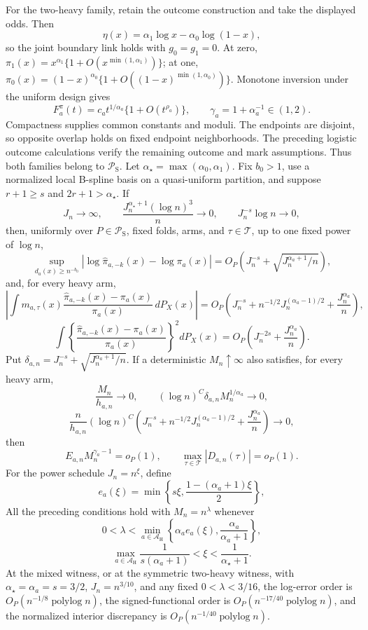 For the two-heavy family, retain the outcome construction and take the displayed odds.  Then
\[
 \eta(x)=\alpha_1\log x-\alpha_0\log(1-x),
\]
so the joint boundary link holds with \(g_0=g_1=0\).  At zero, \(\pi_1(x)=x^{\alpha_1}\{1+O(x^{\min(1,\alpha_1)})\}\); at one, \(\pi_0(x)=(1-x)^{\alpha_0}\{1+O((1-x)^{\min(1,\alpha_0)})\}\).  Monotone inversion under the uniform design gives
\[
 F_a^\pi(t)=c_at^{1/\alpha_a}\{1+O(t^{\rho_a})\},
 \qquad \gamma_a=1+\alpha_a^{-1}\in(1,2).
\]
Compactness supplies common constants and moduli.  The endpoints are disjoint, so opposite overlap holds on fixed endpoint neighborhoods.  The preceding logistic outcome calculations verify the remaining outcome and mark assumptions.  Thus both families belong to \(\mathcal P_{\mathrm S}\).
Let \(\alpha_\star=\max(\alpha_0,\alpha_1)\).  Fix \(b_0>1\), use a normalized local B-spline basis on a quasi-uniform partition, and suppose \(r+1\ge s\) and \(2r+1>\alpha_\star\).  If
\[
 J_n\to\infty,\qquad
 \frac{J_n^{\alpha_\star+1}(\log n)^3}{n}\to0,
 \qquad J_n^{-s}\log n\to0,
\]
then, uniformly over \(P\in\mathcal P_{\mathrm S}\), fixed folds, arms, and \(\tau\in\mathcal T\), up to one fixed power of \(\log n\),
\[
 \sup_{d_a(x)\ge n^{-b_0}}
 |\log\widehat\pi_{a,-k}(x)-\log\pi_a(x)|
 =O_P\!\left(J_n^{-s}+\sqrt{J_n^{\alpha_a+1}/n}\right),
\]
and, for every heavy arm,
\[
 \left|\int m_{a,\tau}(x)
 \frac{\widehat\pi_{a,-k}(x)-\pi_a(x)}{\pi_a(x)}\,dP_X(x)\right|
 =O_P\!\left(J_n^{-s}+n^{-1/2}J_n^{(\alpha_a-1)/2}+\frac{J_n^{\alpha_a}}n\right),
\]
\[
 \int\left\{\frac{\widehat\pi_{a,-k}(x)-\pi_a(x)}{\pi_a(x)}\right\}^2dP_X(x)
 =O_P\!\left(J_n^{-2s}+\frac{J_n^{\alpha_a}}n\right).
\]
Put \(\delta_{a,n}=J_n^{-s}+\sqrt{J_n^{\alpha_a+1}/n}\).  If a deterministic \(M_n\uparrow\infty\) also satisfies, for every heavy arm,
\[
 \frac{M_n}{h_{a,n}}\to0,
 \qquad
 (\log n)^C\delta_{a,n}M_n^{1/\alpha_a}\to0,
\]
\[
 \frac n{h_{a,n}}(\log n)^C
 \left(J_n^{-s}+n^{-1/2}J_n^{(\alpha_a-1)/2}+\frac{J_n^{\alpha_a}}n\right)\to0,
\]
then
\[
 E_{a,n}M_n^{\gamma_a-1}=o_P(1),
 \qquad
 \max_{\tau\in\mathcal T}|D_{a,n}(\tau)|=o_P(1).
\]
For the power schedule \(J_n=n^\xi\), define
\[
 e_a(\xi)=\min\left\{s\xi,\frac{1-(\alpha_a+1)\xi}{2}\right\},
\]
All the preceding conditions hold with \(M_n=n^\lambda\) whenever
\[
 0<\lambda<
 \min_{a\in\mathcal A_{\mathrm H}}
 \left\{\alpha_ae_a(\xi),\frac{\alpha_a}{\alpha_a+1}\right\},
\]
\[
 \max_{a\in\mathcal A_{\mathrm H}}\frac1{s(\alpha_a+1)}<\xi<\frac1{\alpha_\star+1}.
\]
At the mixed witness, or at the symmetric two-heavy witness, with \(\alpha_\star=\alpha_a=s=3/2\), \(J_n=n^{3/10}\), and any fixed \(0<\lambda<3/16\), the log-error order is \(O_P(n^{-1/8}\operatorname{polylog}n)\), the signed-functional order is \(O_P(n^{-17/40}\operatorname{polylog}n)\), and the normalized interior discrepancy is \(O_P(n^{-1/40}\operatorname{polylog}n)\).
